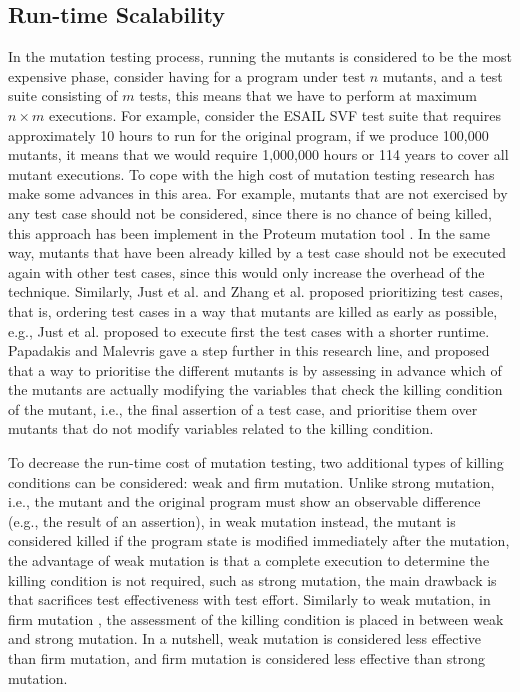 
\subsection{Run-time Scalability}
\label{sec:opt:execution}

In the mutation testing process, running the mutants is considered to be the most expensive phase, consider having for a program under test $n$ mutants, and a test suite consisting of $m$ tests, this means that we have to perform at maximum $n \times m$ executions.
For example, consider the ESAIL SVF test suite that requires approximately 10 hours to run for the original program, if we produce 100,000 mutants, it means that we would require 1,000,000 hours or 114 years to cover all mutant executions.
To cope with the high cost of mutation testing research has make some advances in this area. For example, mutants that are not exercised by any test case should not be considered, since there is no chance of being killed, this approach has been implement in the Proteum mutation tool \cite{delamaro1996proteum}. In the same way, mutants that have been already killed by a test case should not be executed again with other test cases, since this would only increase the overhead of the technique. Similarly, Just et al. \cite{just2012using} and Zhang et al. \cite{zhang2013faster} proposed prioritizing test cases, that is, ordering test cases in a way that mutants are killed as early as possible, e.g., Just et al. \cite{just2012using} proposed to execute first the test cases with a shorter runtime. Papadakis and Malevris \cite{papadakis2011automatically} gave a step further in this research line, and proposed that a way to prioritise the different mutants is by assessing in advance which of the mutants are actually modifying the variables that check the killing condition of the mutant, i.e., the final assertion of a test case, and prioritise them over mutants that do not modify variables related to the killing condition.

To decrease the run-time cost of mutation testing, two additional types of killing conditions can be considered: weak and firm mutation. Unlike strong mutation, i.e., the mutant and the original program must show an observable difference (e.g., the result of an assertion), in weak mutation \cite{ammann2016introduction} instead, the mutant is considered killed if the program state is modified immediately after the mutation, the advantage of weak mutation is that a complete execution to determine the killing condition is not required, such as strong mutation, the main drawback is that sacrifices test effectiveness with test effort. Similarly to weak mutation, in firm mutation \cite{ammann2016introduction}, the assessment of the killing condition is placed in between weak and strong mutation. In a nutshell, weak mutation is considered less effective than firm mutation, and firm mutation is considered less effective than strong mutation.

